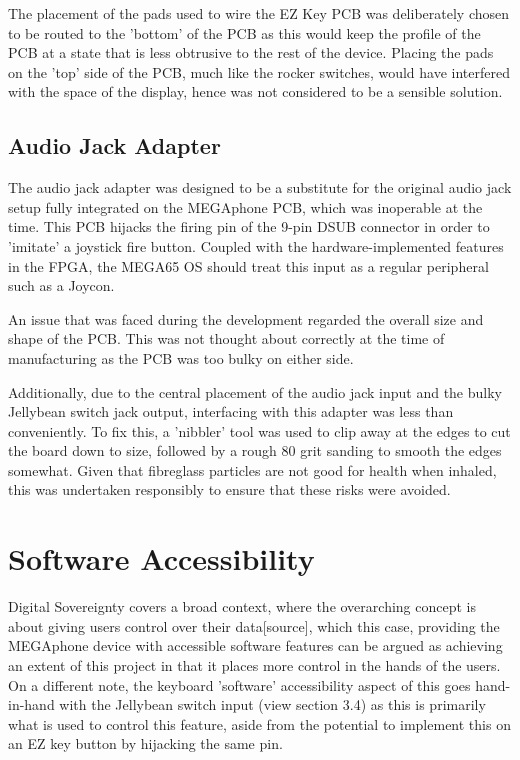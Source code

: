 The placement of the pads used to wire the EZ Key PCB was deliberately chosen to be routed to the 'bottom' of the PCB as this would keep the profile of the PCB at a state that is less obtrusive to the rest of the device.
Placing the pads on the 'top' side of the PCB, much like the rocker switches, would have interfered with the space of the display, hence was not considered to be a sensible solution.

\subsection{Audio Jack Adapter}

The audio jack adapter was designed to be a substitute for the original audio jack setup fully integrated on the MEGAphone PCB, which was inoperable at the time.
This PCB hijacks the firing pin of the 9-pin DSUB connector in order to 'imitate' a joystick fire button. 
Coupled with the hardware-implemented features in the FPGA, the MEGA65 OS should treat this input as a regular peripheral such as a Joycon.

An issue that was faced during the development regarded the overall size and shape of the PCB.
This was not thought about correctly at the time of manufacturing as the PCB was too bulky on either side.

Additionally, due to the central placement of the audio jack input and the bulky Jellybean switch jack output, interfacing with this adapter was less than conveniently.
To fix this, a 'nibbler' tool was used to clip away at the edges to cut the board down to size, followed by a rough 80 grit sanding to smooth the edges somewhat.
Given that fibreglass particles are not good for health when inhaled, this was undertaken responsibly to ensure that these risks were avoided.


\section{Software Accessibility}
Digital Sovereignty covers a broad context, where the overarching concept is about giving users control over their data[source], which this case, providing the MEGAphone device with accessible software features can be argued as achieving an extent of this project in that it places more control in the hands of the users.
On a different note, the keyboard 'software' accessibility aspect of this goes hand-in-hand with the Jellybean switch input (view section 3.4) as this is primarily what is used to control this feature, aside from the potential to implement this on an EZ key button by hijacking the same pin.

